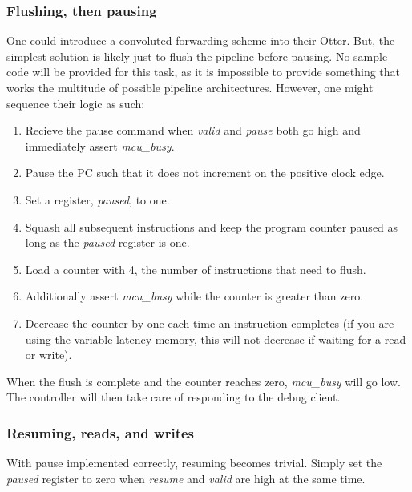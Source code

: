 \documentclass[10pt,a4paper]{article}
\begin{document}
\subsubsection{Flushing, then pausing}
One could introduce a convoluted forwarding scheme into their Otter. But, the simplest solution
is likely just to flush the pipeline before pausing. No sample code will be provided for this task,
as it is impossible to provide something that works the multitude of possible pipeline
architectures. However, one might sequence their logic as such:

\begin{enumerate}
    \item Recieve the pause command when \emph{valid} and \emph{pause} both go high and immediately
        assert \emph{mcu\_busy}.

    \item Pause the PC such that it does not increment on the positive clock edge.

    \item Set a register, \emph{paused}, to one.

    \item Squash all subsequent instructions and keep the program counter paused as long as the
        \emph{paused} register is one.

    \item Load a counter with 4, the number of instructions that need to flush.

    \item Additionally assert \emph{mcu\_busy} while the counter is greater than zero.

    \item Decrease the counter by one each time an instruction completes (if you are using the
        variable latency memory, this will not decrease if waiting for a read or write).
\end{enumerate}

When the flush is complete and the counter reaches zero, \emph{mcu\_busy} will go low. The
controller will then take care of responding to the debug client.

\subsubsection{Resuming, reads, and writes}
With pause implemented correctly, resuming becomes trivial. Simply set the \emph{paused} register to
zero when \emph{resume} and \emph{valid} are high at the same time.
\end{document}
